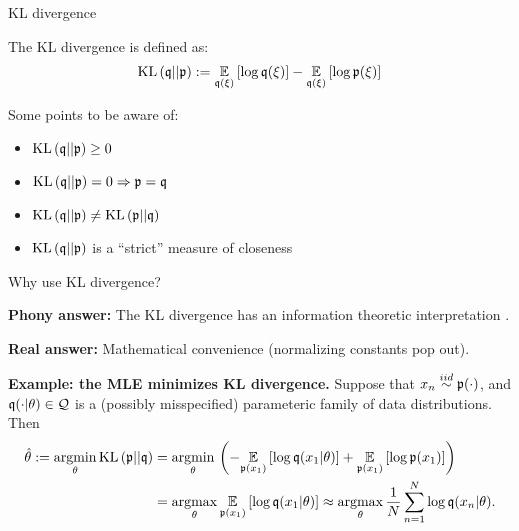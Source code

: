 \begin{frame}{KL divergence}

The KL divergence is defined as:
%
\begin{align*}
%
\kl{\q}{\p} :=
\expect{\q(\xi)}{\log \q(\xi)} - \expect{\q(\xi)}{\log \p(\xi)}
%
\end{align*}
%

Some points to be aware of:
\begin{itemize}
    \item $\mathrm{KL}\left(\mathfrak{q} || \mathfrak{p} \right) \ge 0$
    \item $\mathrm{KL}\left(\mathfrak{q} || \mathfrak{p} \right) = 0 \Rightarrow \mathfrak{p} = \mathfrak{q}$
    \item $\mathrm{KL}\left(\mathfrak{q} || \mathfrak{p} \right) \ne \mathrm{KL}\left(\mathfrak{p} || \mathfrak{q} \right)$
    \item $\mathrm{KL}\left(\mathfrak{q} || \mathfrak{p} \right)$ is a ``strict'' measure of closeness
        \citep{gibbs2002choosing}
\end{itemize}

Why use KL divergence?

\textbf{Phony answer:}
The KL divergence has an information theoretic
interpretation \citep{kullback1951information}.

\textbf{Real answer:}
Mathematical convenience (normalizing constants pop out).

\textbf{Example: the MLE minimizes KL divergence.}  Suppose that $x_n \overset{iid}{\sim}
\mathfrak{p}(\cdot)$, and $\mathfrak{q}(\cdot | \theta) \in \mathcal{Q}$ is a (possibly misspecified)
parameteric family of data distributions. Then
%
\begin{align*}
%
\hat\theta := \argmin{\theta} \kl{\p}{\q} ={}&
\argmin{\theta}\left(  - \expect{\p(x_1)}{\log \q(x_1 | \theta)}
    + \expect{\p(x_1)}{\log \p(x_1)} \right) \\
={}&
\argmax{\theta} \expect{\p(x_1)}{\log \q(x_1 | \theta)}
\approx \argmax{\theta} \meann \log \q(x_n | \theta).
%
\end{align*}

\end{frame}
